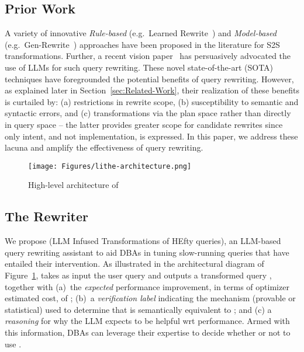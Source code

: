 \subsection*{Prior Work}
A variety of innovative \emph{Rule-based} (e.g.~Learned Rewrite~\cite{Learned_Rewrite}) and \emph{Model-based} (e.g.~Gen-Rewrite~\cite{Genrewrite}) approaches have been proposed in the literature for S2S transformations. Further, a recent vision paper~\cite{DBGPT} has persuasively advocated the use of LLMs for such query rewriting. These novel state-of-the-art (SOTA) techniques have foregrounded the potential benefits of query rewriting. However, as explained later in Section~\ref{sec:Related-Work}, their realization of these benefits is curtailed by: (a) restrictions in rewrite scope, (b) susceptibility to semantic and syntactic errors, and (c) transformations via the plan space rather than directly in query space -- the latter provides greater scope for candidate rewrites since only intent, and not implementation, is expressed.  In this paper, we address these lacuna and amplify the effectiveness of query rewriting.

\begin{figure}[t]
    \centering
    \texttt{[image: Figures/lithe-architecture.png]}
    \caption{High-level architecture of \lithe}
    \label{fig:lithe}
    \vspace{-0.1in}
\end{figure}

\subsection*{The \lithe Rewriter}
\label{sec:LITHE REWRITE}

We propose \lithe (LLM Infused Transformations of HEfty queries), an LLM-based query rewriting assistant to aid DBAs in tuning slow-running queries that have entailed their intervention. As illustrated in the architectural diagram of Figure~\ref{fig:lithe}, \lithe takes as input the user query \qu and outputs a transformed query \qt, together with 
(a)~the \emph{expected} performance improvement, in terms of optimizer estimated cost, of \qt; 
(b)~a \textit{verification label} indicating the mechanism (provable or statistical) used to determine that \qt is semantically equivalent to \qu; and
(c) a \textit{reasoning} for why the LLM expects \qt to be helpful wrt performance.
Armed with this information, DBAs can leverage their expertise to decide whether or not to use \qt.


